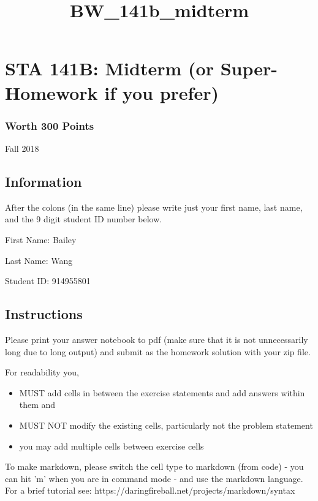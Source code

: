 \documentclass[11pt]{article}
\title{BW\_141b\_midterm}
\providecommand{\tightlist}{%
      \setlength{\itemsep}{0pt}\setlength{\parskip}{0pt}}
\begin{document}
    
    
    \maketitle
    
    

    
    \section{STA 141B: Midterm (or Super-Homework if you
prefer)}\label{sta-141b-midterm-or-super-homework-if-you-prefer}

\subsubsection{Worth 300 Points}\label{worth-300-points}

Fall 2018

    \subsection{Information}\label{information}

After the colons (in the same line) please write just your first name,
last name, and the 9 digit student ID number below.

First Name: Bailey

Last Name: Wang

Student ID: 914955801

    \subsection{Instructions}\label{instructions}

Please print your answer notebook to pdf (make sure that it is not
unnecessarily long due to long output) and submit as the homework
solution with your zip file.

For readability you,

\begin{itemize}
\tightlist
\item
  MUST add cells in between the exercise statements and add answers
  within them and
\item
  MUST NOT modify the existing cells, particularly not the problem
  statement
\item
  you may add multiple cells between exercise cells
\end{itemize}

To make markdown, please switch the cell type to markdown (from code) -
you can hit 'm' when you are in command mode - and use the markdown
language. For a brief tutorial see:
https://daringfireball.net/projects/markdown/syntax
\end{document}
